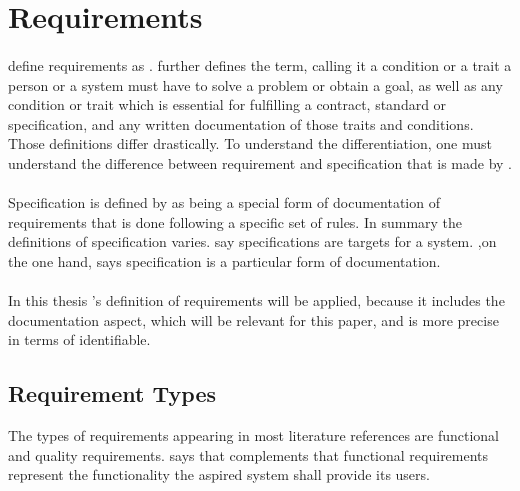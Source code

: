 \section{Requirements}
\paragraph{} \textcite[4]{Sommerville.2000} define requirements as . \textcite[13]{Pohl.2007} further defines the term, calling it a condition or a trait a person or a system must have to solve a problem or obtain a goal, as well as any condition or trait which is essential for fulfilling a contract, standard or specification, and any written documentation of those traits and conditions. Those definitions differ drastically. To understand the differentiation, one must understand the difference between requirement and specification that is made by \citeauthor{Pohl.2007}.

\paragraph{} Specification is defined by \textcite[220]{Pohl.2007} as being a special form of documentation of requirements that is done following a specific set of rules. In summary the definitions of specification varies. \citeauthor{Sommerville.2000} say specifications are targets for a system. \citeauthor{Pohl.2007},on the one hand, says specification is a particular form of documentation.

\paragraph{} In this thesis \citeauthor{Pohl.2007}'s definition of requirements will be applied, because it includes the documentation aspect, which will be relevant for this paper, and is more precise in terms of identifiable.


\subsection{Requirement Types \label{ssec:reqTypes}}
The types of requirements appearing in most literature references are functional and quality requirements. \textcite[14]{Lauesen.2008} says that  \textcite[cf.][15]{Pohl.2007} complements that functional requirements represent the functionality the aspired system shall provide its users. 

